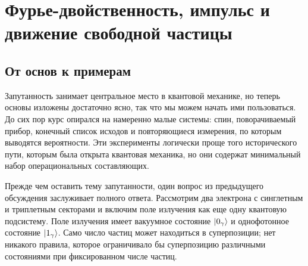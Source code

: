 \chapter{Фурье-двойственность, импульс и движение свободной частицы}

\section{От основ к примерам}

Запутанность занимает центральное место в квантовой механике, но теперь основы изложены достаточно ясно, так что мы можем начать ими пользоваться. До сих пор курс опирался на намеренно малые системы: спин, поворачиваемый прибор, конечный список исходов и повторяющиеся измерения, по которым выводятся вероятности. Эти эксперименты логически проще того исторического пути, которым была открыта квантовая механика, но они содержат минимальный набор операциональных составляющих.

\begin{classroomqa}
\end{classroomqa}

\begin{classroomqa}
\end{classroomqa}

Прежде чем оставить тему запутанности, один вопрос из предыдущего обсуждения заслуживает полного ответа. Рассмотрим два электрона с синглетным и триплетным секторами и включим поле излучения как еще одну квантовую подсистему. Поле излучения имеет вакуумное состояние \(\left\lvert0_\gamma\right\rangle\) и однофотонное состояние \(\left\lvert1_\gamma\right\rangle\). Само число частиц может находиться в суперпозиции; нет никакого правила, которое ограничивало бы суперпозицию различными состояниями при фиксированном числе частиц.

